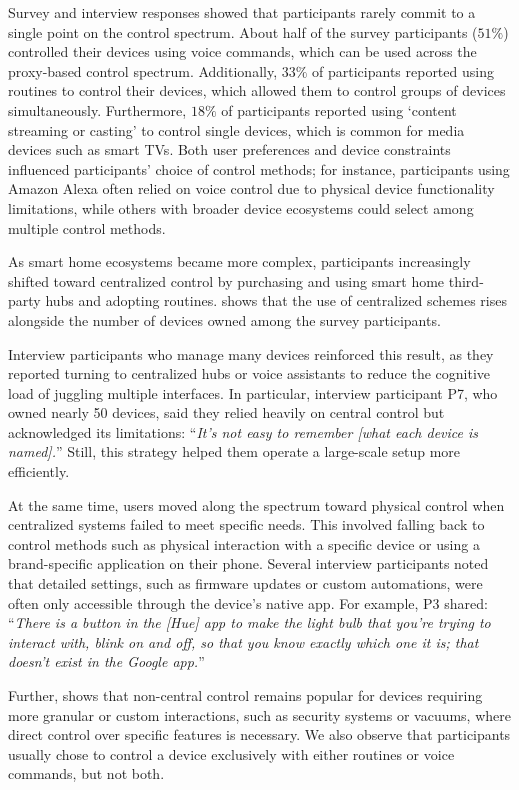Survey and interview responses showed that participants rarely commit to a single point on the control spectrum. 
About half of the survey participants ($51\%$) controlled their devices using voice commands, which can be used across the proxy-based control spectrum. Additionally, $33\%$ of participants reported using routines to control their devices, which allowed them to control groups of devices simultaneously. Furthermore, $18\%$ of participants reported using `content streaming or casting' to control single devices, which is common for media devices such as smart TVs. Both user preferences and device constraints influenced participants' choice of control methods; for instance, participants using Amazon Alexa often relied on voice control due to physical device functionality limitations, while others with broader device ecosystems could select among multiple control methods.

As smart home ecosystems became more complex, participants increasingly shifted toward centralized control by purchasing and using smart home third-party hubs and adopting routines.  shows that the use of centralized schemes rises alongside the number of devices owned among the survey participants. 

Interview participants who manage many devices reinforced this result, as they reported turning to centralized hubs or voice assistants to reduce the cognitive load of juggling multiple interfaces. 
In particular, interview participant P7, who owned nearly 50 devices, said they relied heavily on central control but acknowledged its limitations: ``\textit{It's not easy to remember [what each device is named].}'' Still, this strategy helped them operate a large-scale setup more efficiently. 

At the same time, users moved along the spectrum toward physical control when centralized systems failed to meet specific needs. This involved falling back to control methods such as physical interaction with a specific device or using a brand-specific application on their phone. Several interview participants noted that detailed settings, such as firmware updates or custom automations, were often only accessible through the device's native app. For example, P3 shared: ``\textit{There is a button in the [Hue] app to make the light bulb that you're trying to interact with, blink on and off, so that you know exactly which one it is; that doesn't exist in the Google app.}'' 

Further,  shows that non-central control remains popular for devices requiring more granular or custom interactions, such as security systems or vacuums, where direct control over specific features is necessary. We also observe that participants usually chose to control a device exclusively with either routines or voice commands, but not both.

